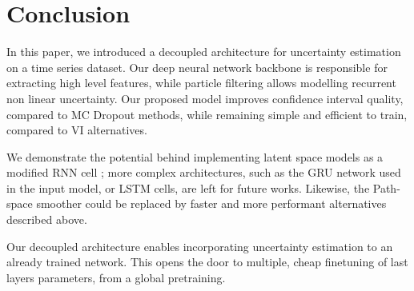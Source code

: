\documentclass[journal]{IEEEtran}
\begin{document}

\section{Conclusion}%
\label{sec:conclusion}

In this paper, we introduced a decoupled architecture for uncertainty estimation on a time series dataset.
Our deep neural network backbone is responsible for extracting high level features, while particle filtering allows modelling recurrent non linear uncertainty.
Our proposed model improves confidence interval quality, compared to MC Dropout methods, while remaining simple and efficient to train, compared to VI alternatives.

We demonstrate the potential behind implementing latent space models as a modified RNN cell ;
more complex architectures, such as the GRU network used in the input model, or LSTM cells, are left for future works.
Likewise, the Path-space smoother could be replaced by faster and more performant alternatives described above.

Our decoupled architecture enables incorporating uncertainty estimation to an already trained network.
This opens the door to multiple, cheap finetuning of last layers parameters, from a global pretraining.

\clearpage


\end{document}
